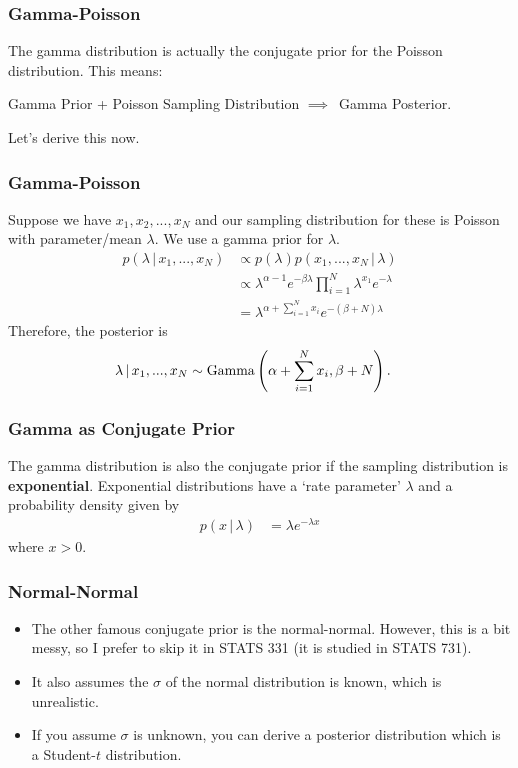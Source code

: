 \documentclass{beamer}
\newcommand{\given}{\,|\,}
\begin{document}
\begin{frame}
\frametitle{Gamma-Poisson}

The gamma distribution is actually the conjugate prior for the Poisson distribution. This means:

Gamma Prior + Poisson Sampling Distribution $\implies$~Gamma Posterior.

Let's derive this now.


\end{frame}


\begin{frame}
\frametitle{Gamma-Poisson}
Suppose we have $x_1, x_2, ..., x_N$ and our sampling distribution for these
is Poisson with parameter/mean $\lambda$. We use a gamma prior for $\lambda$.
\pause
\begin{align}
p(\lambda \given x_1, ..., x_N)
    &\propto p(\lambda)p(x_1, ..., x_N \given \lambda) \\
    &\propto \lambda^{\alpha-1}e^{-\beta \lambda}
            \prod_{i=1}^N \lambda^{x_1}e^{-\lambda} \\
    &= \lambda^{\alpha + \sum_{i=1}^N x_i}e^{-(\beta + N)\lambda}
\end{align}
Therefore, the posterior is
\begin{align}
\lambda \given x_1, ..., x_N &\sim
    \textnormal{Gamma}\left(\alpha + \sum_{i=1}^N x_i, \beta + N\right).
\end{align}



\end{frame}


\begin{frame}
\frametitle{Gamma as Conjugate Prior}
The gamma distribution is also the conjugate prior if the sampling
distribution is {\bf exponential}. Exponential distributions have a
`rate parameter' $\lambda$ and a probability density given by
\begin{align}
p(x \given \lambda) &= \lambda e^{-\lambda x}
\end{align}
where $x > 0$.

\end{frame}

\begin{frame}
\frametitle{Normal-Normal}
\begin{itemize}
\item The other famous conjugate prior is the normal-normal. However, this is a bit
messy, so I prefer to skip it in STATS 331 (it is studied in STATS 731).\pause
\item It also assumes the $\sigma$ of the normal distribution is known, which
is unrealistic.\pause
\item If you assume $\sigma$ is unknown, you can derive a posterior distribution
which is a Student-$t$ distribution.
\end{itemize}

\end{frame}
\end{document}
